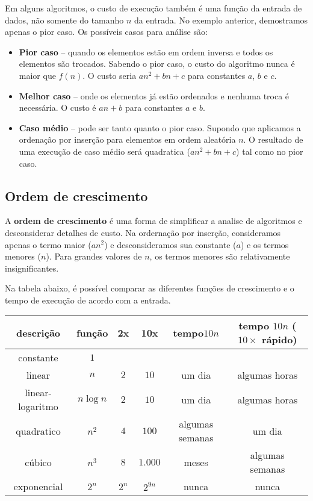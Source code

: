 Em alguns algoritmos, o custo de execução também é uma função da entrada de dados, não somente
do tamanho $n$ da entrada.
No exemplo anterior, demostramos apenas o pior caso. 
Os possíveis casos para análise são:
\begin{itemize}
\item {\bf Pior caso} -- quando os elementos estão em ordem inversa e todos os elementos 
são trocados.
Sabendo o pior caso, o custo do algoritmo nunca é maior que $f(n)$.
O custo seria $an^2 + bn +c$ para constantes $a$, $b$ e $c$.

\item {\bf Melhor caso} -- onde os elementos já estão ordenados e nenhuma troca é necessária.
O custo é $an + b$ para constantes $a$ e $b$.

\item {\bf Caso médio} -- pode ser tanto quanto o pior caso. Supondo que aplicamos 
a ordenação por inserção para elementos em ordem aleatória $n$. 
O resultado de uma execução de caso médio será quadratica ($an^2 + bn +c$)
tal como no pior caso.
\end{itemize}


\subsection{Ordem de crescimento}

A {\bf ordem de crescimento} é uma forma de simplificar a analise de algoritmos
e desconsiderar detalhes de custo.
Na ordernação por inserção, consideramos apenas o termo maior ($an^2$) e desconsideramos
sua constante ($a$) e os termos menores ($n$). 
Para grandes valores de $n$, os termos menores são relativamente insignificantes.

Na tabela abaixo, é possível comparar as diferentes funções de crescimento e 
o tempo de execução de acordo com a entrada.
\begin{table}[ht]
\centering
\begin{tabular}{cccccc}
\hline
{\bf descrição} & {\bf função} & {\bf 2x} & {\bf 10x} & {\bf tempo$10n$} & {\bf tempo $10n$ ($10\times$ rápido)} \\ 
\hline
constante        & $1$ & & & &  \\
linear           & $n$        & $2$ & $10$ & um dia & algumas horas \\
linear-logaritmo & $n \log n$ & $2$ & $10$ & um dia & algumas horas \\
quadratico       & $n^2$      & $4$  & $100$ & algumas semanas & um dia  \\
cúbico           & $n^3$ & $8$ & $1.000$ & meses & algumas semanas  \\
exponencial      & $2^n$  & $2^n$ & $2^{9n}$ & nunca & nunca  \\
\hline
\end{tabular}
\end{table}

